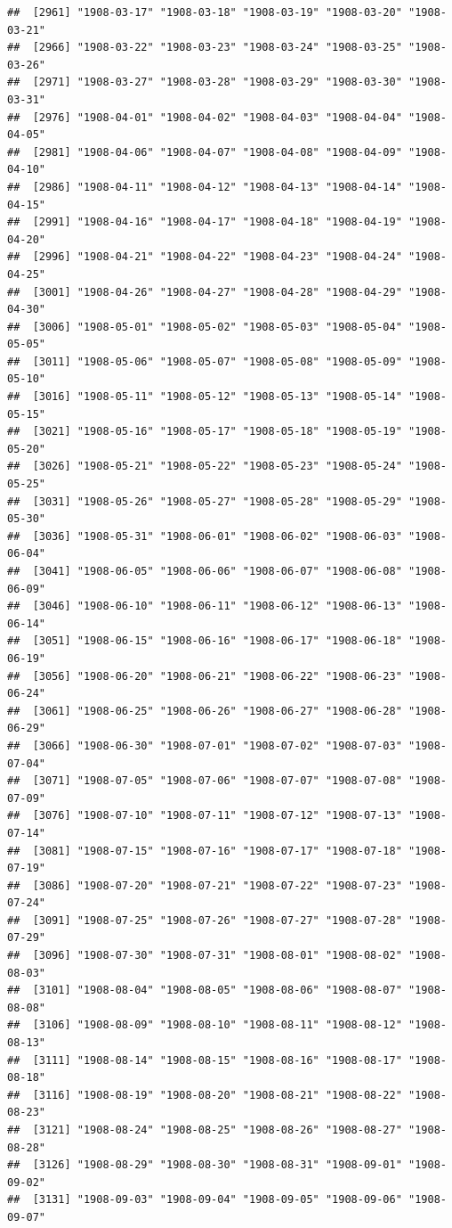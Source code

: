 \documentclass{article}\usepackage[]{graphicx}\usepackage[]{color}
\makeatletter
\newenvironment{kframe}{%
 \def\at@end@of@kframe{}%
 \ifinner\ifhmode%
  \def\at@end@of@kframe{\end{minipage}}%
  \begin{minipage}{\columnwidth}%
 \fi\fi%
 \def\FrameCommand##1{\hskip\@totalleftmargin \hskip-\fboxsep
 \colorbox{shadecolor}{##1}\hskip-\fboxsep
     \hskip-\linewidth \hskip-\@totalleftmargin \hskip\columnwidth}%
 \MakeFramed {\advance\hsize-\width
   \@totalleftmargin\z@ \linewidth\hsize
   \@setminipage}}%
 {\par\unskip\endMakeFramed%
 \at@end@of@kframe}
\newenvironment{knitrout}{}{} %
\makeatother
\begin{document}
\begin{description}
\begin{knitrout}
\begin{kframe}
\begin{verbatim}
##  [2961] "1908-03-17" "1908-03-18" "1908-03-19" "1908-03-20" "1908-03-21"
##  [2966] "1908-03-22" "1908-03-23" "1908-03-24" "1908-03-25" "1908-03-26"
##  [2971] "1908-03-27" "1908-03-28" "1908-03-29" "1908-03-30" "1908-03-31"
##  [2976] "1908-04-01" "1908-04-02" "1908-04-03" "1908-04-04" "1908-04-05"
##  [2981] "1908-04-06" "1908-04-07" "1908-04-08" "1908-04-09" "1908-04-10"
##  [2986] "1908-04-11" "1908-04-12" "1908-04-13" "1908-04-14" "1908-04-15"
##  [2991] "1908-04-16" "1908-04-17" "1908-04-18" "1908-04-19" "1908-04-20"
##  [2996] "1908-04-21" "1908-04-22" "1908-04-23" "1908-04-24" "1908-04-25"
##  [3001] "1908-04-26" "1908-04-27" "1908-04-28" "1908-04-29" "1908-04-30"
##  [3006] "1908-05-01" "1908-05-02" "1908-05-03" "1908-05-04" "1908-05-05"
##  [3011] "1908-05-06" "1908-05-07" "1908-05-08" "1908-05-09" "1908-05-10"
##  [3016] "1908-05-11" "1908-05-12" "1908-05-13" "1908-05-14" "1908-05-15"
##  [3021] "1908-05-16" "1908-05-17" "1908-05-18" "1908-05-19" "1908-05-20"
##  [3026] "1908-05-21" "1908-05-22" "1908-05-23" "1908-05-24" "1908-05-25"
##  [3031] "1908-05-26" "1908-05-27" "1908-05-28" "1908-05-29" "1908-05-30"
##  [3036] "1908-05-31" "1908-06-01" "1908-06-02" "1908-06-03" "1908-06-04"
##  [3041] "1908-06-05" "1908-06-06" "1908-06-07" "1908-06-08" "1908-06-09"
##  [3046] "1908-06-10" "1908-06-11" "1908-06-12" "1908-06-13" "1908-06-14"
##  [3051] "1908-06-15" "1908-06-16" "1908-06-17" "1908-06-18" "1908-06-19"
##  [3056] "1908-06-20" "1908-06-21" "1908-06-22" "1908-06-23" "1908-06-24"
##  [3061] "1908-06-25" "1908-06-26" "1908-06-27" "1908-06-28" "1908-06-29"
##  [3066] "1908-06-30" "1908-07-01" "1908-07-02" "1908-07-03" "1908-07-04"
##  [3071] "1908-07-05" "1908-07-06" "1908-07-07" "1908-07-08" "1908-07-09"
##  [3076] "1908-07-10" "1908-07-11" "1908-07-12" "1908-07-13" "1908-07-14"
##  [3081] "1908-07-15" "1908-07-16" "1908-07-17" "1908-07-18" "1908-07-19"
##  [3086] "1908-07-20" "1908-07-21" "1908-07-22" "1908-07-23" "1908-07-24"
##  [3091] "1908-07-25" "1908-07-26" "1908-07-27" "1908-07-28" "1908-07-29"
##  [3096] "1908-07-30" "1908-07-31" "1908-08-01" "1908-08-02" "1908-08-03"
##  [3101] "1908-08-04" "1908-08-05" "1908-08-06" "1908-08-07" "1908-08-08"
##  [3106] "1908-08-09" "1908-08-10" "1908-08-11" "1908-08-12" "1908-08-13"
##  [3111] "1908-08-14" "1908-08-15" "1908-08-16" "1908-08-17" "1908-08-18"
##  [3116] "1908-08-19" "1908-08-20" "1908-08-21" "1908-08-22" "1908-08-23"
##  [3121] "1908-08-24" "1908-08-25" "1908-08-26" "1908-08-27" "1908-08-28"
##  [3126] "1908-08-29" "1908-08-30" "1908-08-31" "1908-09-01" "1908-09-02"
##  [3131] "1908-09-03" "1908-09-04" "1908-09-05" "1908-09-06" "1908-09-07"

\end{verbatim}
\end{kframe}
\end{knitrout}
\end{description}
\end{document}
